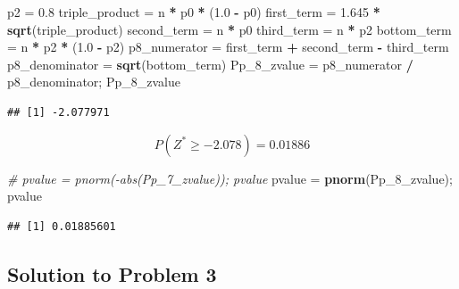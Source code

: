 \documentclass[]{article}
\newenvironment{Shaded}{\begin{snugshade}}{\end{snugshade}}
\newcommand{\CommentTok}[1]{\textcolor[rgb]{0.56,0.35,0.01}{\textit{#1}}}
\newcommand{\DecValTok}[1]{\textcolor[rgb]{0.00,0.00,0.81}{#1}}
\newcommand{\FloatTok}[1]{\textcolor[rgb]{0.00,0.00,0.81}{#1}}
\newcommand{\KeywordTok}[1]{\textcolor[rgb]{0.13,0.29,0.53}{\textbf{#1}}}
\newcommand{\NormalTok}[1]{#1}
\newcommand{\OperatorTok}[1]{\textcolor[rgb]{0.81,0.36,0.00}{\textbf{#1}}}
\newcommand{\StringTok}[1]{\textcolor[rgb]{0.31,0.60,0.02}{#1}}
\begin{document}
\begin{Shaded}
\begin{Highlighting}[]
\NormalTok{p2 =}\StringTok{ }\FloatTok{0.8}
\NormalTok{triple_product =}\StringTok{ }\NormalTok{n }\OperatorTok{*}\StringTok{ }\NormalTok{p0 }\OperatorTok{*}\StringTok{ }\NormalTok{(}\FloatTok{1.0} \OperatorTok{-}\StringTok{ }\NormalTok{p0)}
\NormalTok{first_term =}\StringTok{ }\FloatTok{1.645} \OperatorTok{*}\StringTok{ }\KeywordTok{sqrt}\NormalTok{(triple_product)}
\NormalTok{second_term =}\StringTok{ }\NormalTok{n }\OperatorTok{*}\StringTok{ }\NormalTok{p0}
\NormalTok{third_term =}\StringTok{ }\NormalTok{n }\OperatorTok{*}\StringTok{ }\NormalTok{p2}
\NormalTok{bottom_term =}\StringTok{ }\NormalTok{n }\OperatorTok{*}\StringTok{ }\NormalTok{p2 }\OperatorTok{*}\StringTok{ }\NormalTok{(}\FloatTok{1.0} \OperatorTok{-}\StringTok{ }\NormalTok{p2)}
\NormalTok{p8_numerator =}\StringTok{ }\NormalTok{first_term }\OperatorTok{+}\StringTok{ }\NormalTok{second_term }\OperatorTok{-}\StringTok{ }\NormalTok{third_term}
\NormalTok{p8_denominator =}\StringTok{ }\KeywordTok{sqrt}\NormalTok{(bottom_term)}
\NormalTok{Pp_}\DecValTok{8}\NormalTok{_zvalue =}\StringTok{ }\NormalTok{p8_numerator }\OperatorTok{/}\StringTok{ }\NormalTok{p8_denominator; Pp_}\DecValTok{8}\NormalTok{_zvalue}
\end{Highlighting}
\end{Shaded}

\begin{verbatim}
## [1] -2.077971
\end{verbatim}

\[
    P(Z^* \geq -2.078) = 0.01886
\]

\begin{Shaded}
\begin{Highlighting}[]
\CommentTok{# pvalue = pnorm(-abs(Pp_7_zvalue)); pvalue}
\NormalTok{pvalue =}\StringTok{ }\KeywordTok{pnorm}\NormalTok{(Pp_}\DecValTok{8}\NormalTok{_zvalue); pvalue}
\end{Highlighting}
\end{Shaded}

\begin{verbatim}
## [1] 0.01885601
\end{verbatim}

\hypertarget{solution-to-problem-3}{%
\subsection{Solution to Problem 3}\label{solution-to-problem-3}}
\end{document}
